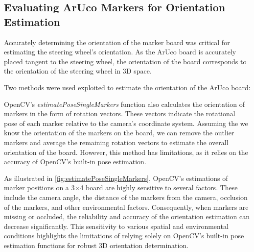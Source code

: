 \subsection{Evaluating ArUco Markers for Orientation Estimation}
Accurately determining the orientation of the marker board was 
critical for estimating the steering wheel’s orientation. 
As the ArUco board is accurately placed tangent to the steering 
wheel, the orientation of the board corresponds to the 
orientation of the steering wheel in 3D space. 

Two methods were used exploited to estimate the orientation of 
the ArUco board: 

OpenCV’s \emph{estimatePoseSingleMarkers} function also calculates the 
orientation of markers in the form of rotation vectors. 
These vectors indicate the rotational pose of each marker 
relative to the camera’s coordinate system. Assuming the we 
know the  orientation of the markers on the board, we can 
remove the outlier markers and average the remaining rotation 
vectors to estimate the overall orientation of the board.
However, this method has limitations, as it relies on the 
accuracy of OpenCV's built-in pose estimation.

As illustrated in \cref{fig:estimatePoseSingleMarkers}, 
OpenCV's estimations of marker 
positions on a 3×4 board are highly sensitive to several factors. 
These include the camera angle, the distance of the markers from 
the camera, occlusion of the markers, and other environmental 
factors. Consequently, when markers are missing or occluded, 
the reliability and accuracy of the orientation estimation can 
decrease significantly. This sensitivity to various spatial and 
environmental conditions highlights the limitations of relying 
solely on OpenCV's built-in pose estimation functions for robust 
3D orientation determination.

